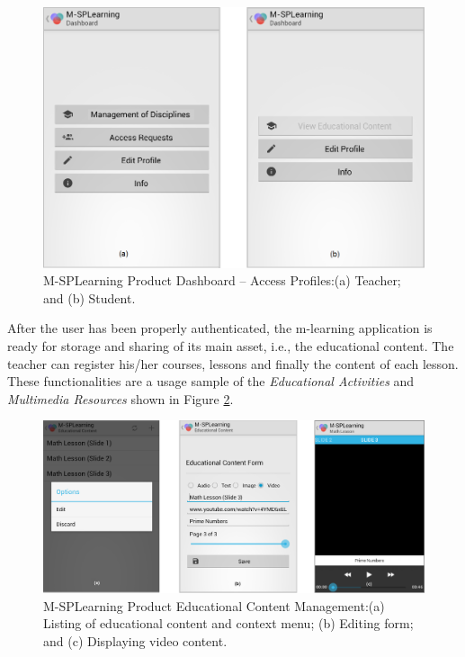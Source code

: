 \begin{figure}
\centering
\includegraphics[scale=0.34]{figures/section3/MSPLDashboardApp}
\caption{M-SPLear\allowbreak ning Product Dashboard -- Access Profiles:\newline(a) Teacher; and (b) Student.}
\label{figureMSPLDashboardApp}
\end{figure}

After the user has been properly authenticated, the m-learning application is ready for storage and sharing of its main asset, i.e., the educational content. The teacher can register his/her courses, lessons and finally the content of each lesson. These functionalities are a usage sample of the \textit{Educational Activities} and \textit{Multimedia Resources} shown in Figure \ref{figureMSPLEducationalContent}.

\begin{figure}
\centering
\includegraphics[scale=0.34]{figures/section3/MSPLEducationalContent}
\caption{M-SPLear\allowbreak ning Product Educational Content Management:\newline(a) Listing of educational content and context menu; (b) Editing form; and (c) Displaying video content.}
\label{figureMSPLEducationalContent}
\end{figure}

